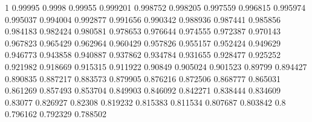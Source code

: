 \def\pgf@def#1#2#3{\expandafter\def\csname pgf@#1#2\endcsname{#3}}
\pgf@def{cosfrac}{0}{1}
\pgf@def{cosfrac}{1}{0.99995}    \pgf@def{cosfrac}{2}{0.9998}
\pgf@def{cosfrac}{3}{0.99955}    \pgf@def{cosfrac}{4}{0.999201}
\pgf@def{cosfrac}{5}{0.998752}   \pgf@def{cosfrac}{6}{0.998205}
\pgf@def{cosfrac}{7}{0.997559}   \pgf@def{cosfrac}{8}{0.996815}
\pgf@def{cosfrac}{9}{0.995974}   \pgf@def{cosfrac}{10}{0.995037}
\pgf@def{cosfrac}{11}{0.994004}  \pgf@def{cosfrac}{12}{0.992877}
\pgf@def{cosfrac}{13}{0.991656}  \pgf@def{cosfrac}{14}{0.990342}
\pgf@def{cosfrac}{15}{0.988936}  \pgf@def{cosfrac}{16}{0.987441}
\pgf@def{cosfrac}{17}{0.985856}  \pgf@def{cosfrac}{18}{0.984183}
\pgf@def{cosfrac}{19}{0.982424}  \pgf@def{cosfrac}{20}{0.980581}
\pgf@def{cosfrac}{21}{0.978653}  \pgf@def{cosfrac}{22}{0.976644}
\pgf@def{cosfrac}{23}{0.974555}  \pgf@def{cosfrac}{24}{0.972387}
\pgf@def{cosfrac}{25}{0.970143}  \pgf@def{cosfrac}{26}{0.967823}
\pgf@def{cosfrac}{27}{0.965429}  \pgf@def{cosfrac}{28}{0.962964}
\pgf@def{cosfrac}{29}{0.960429}  \pgf@def{cosfrac}{30}{0.957826}
\pgf@def{cosfrac}{31}{0.955157}  \pgf@def{cosfrac}{32}{0.952424}
\pgf@def{cosfrac}{33}{0.949629}  \pgf@def{cosfrac}{34}{0.946773}
\pgf@def{cosfrac}{35}{0.943858}  \pgf@def{cosfrac}{36}{0.940887}
\pgf@def{cosfrac}{37}{0.937862}  \pgf@def{cosfrac}{38}{0.934784}
\pgf@def{cosfrac}{39}{0.931655}  \pgf@def{cosfrac}{40}{0.928477}
\pgf@def{cosfrac}{41}{0.925252}  \pgf@def{cosfrac}{42}{0.921982}
\pgf@def{cosfrac}{43}{0.918669}  \pgf@def{cosfrac}{44}{0.915315}
\pgf@def{cosfrac}{45}{0.911922}  \pgf@def{cosfrac}{46}{0.90849}
\pgf@def{cosfrac}{47}{0.905024}  \pgf@def{cosfrac}{48}{0.901523}
\pgf@def{cosfrac}{49}{0.89799}   \pgf@def{cosfrac}{50}{0.894427}
\pgf@def{cosfrac}{51}{0.890835}  \pgf@def{cosfrac}{52}{0.887217}
\pgf@def{cosfrac}{53}{0.883573}  \pgf@def{cosfrac}{54}{0.879905}
\pgf@def{cosfrac}{55}{0.876216}  \pgf@def{cosfrac}{56}{0.872506}
\pgf@def{cosfrac}{57}{0.868777}  \pgf@def{cosfrac}{58}{0.865031}
\pgf@def{cosfrac}{59}{0.861269}  \pgf@def{cosfrac}{60}{0.857493}
\pgf@def{cosfrac}{61}{0.853704}  \pgf@def{cosfrac}{62}{0.849903}
\pgf@def{cosfrac}{63}{0.846092}  \pgf@def{cosfrac}{64}{0.842271}
\pgf@def{cosfrac}{65}{0.838444}  \pgf@def{cosfrac}{66}{0.834609}
\pgf@def{cosfrac}{67}{0.83077}   \pgf@def{cosfrac}{68}{0.826927}
\pgf@def{cosfrac}{69}{0.82308}   \pgf@def{cosfrac}{70}{0.819232}
\pgf@def{cosfrac}{71}{0.815383}  \pgf@def{cosfrac}{72}{0.811534}
\pgf@def{cosfrac}{73}{0.807687}  \pgf@def{cosfrac}{74}{0.803842}
\pgf@def{cosfrac}{75}{0.8}       \pgf@def{cosfrac}{76}{0.796162}
\pgf@def{cosfrac}{77}{0.792329}  \pgf@def{cosfrac}{78}{0.788502}

